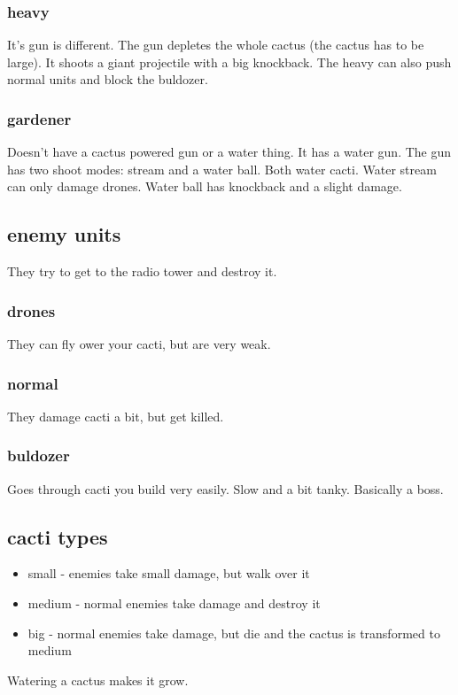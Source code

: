 \documentclass{article}
\begin{document}
\subsubsection{heavy}

It's gun is different. The gun depletes the whole cactus (the cactus has to be
large). It shoots a giant projectile with a big knockback. The heavy can also
push normal units and block the buldozer.

\subsubsection{gardener}

Doesn't have a cactus powered gun or a water thing. It has a water gun.
The gun has two shoot modes: stream and a water ball. Both water cacti.
Water stream can only damage drones. Water ball has knockback and a slight
damage.

\subsection{enemy units}

They try to get to the radio tower and destroy it.

\subsubsection{drones}

They can fly ower your cacti, but are very weak.

\subsubsection{normal}

They damage cacti a bit, but get killed.

\subsubsection{buldozer}

Goes through cacti you build very easily. Slow and a bit tanky. Basically
a boss.

\subsection{cacti types}

\begin{itemize}
	\item small - enemies take small damage, but walk over it
	\item medium - normal enemies take damage and destroy it
	\item big - normal enemies take damage, but die and the cactus is transformed to medium
\end{itemize}

Watering a cactus makes it grow.
\end{document}
